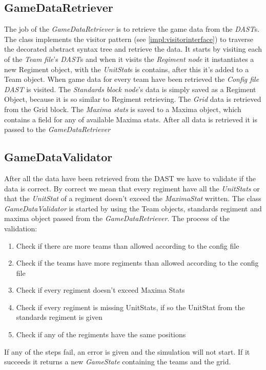 \subsection{GameDataRetriever}
	The job of the {\it GameDataRetriever} is to retrieve the game data from the {\it DAST}s. The class implements the visitor pattern
	(see \ref{impl:visitorinterface}) to traverse the decorated abstract syntax tree and retrieve the data. 
	It starts by visiting each of the {\it Team file}'s {\it DAST}s and when it visits the {\it Regiment node} it instantiates a new Regiment object, 
	with the {\it UnitStat}s is contains, after this it's added to a Team object. When game data for every team have been retrieved the {\it Config file}
	{\it DAST} is visited. The {\it Standards block node}'s data is simply saved as a Regiment Object, because it is so similar to Regiment retrieving. 
	The {\it Grid} data is retrieved from the Grid block. The {\it Maxima stats} is saved to a Maxima object, which contains a field for any of available 
	Maxima stats. After all data is retrieved it is passed to the {\it GameDataRetriever}

\subsection{GameDataValidator}
	After all the data have been retrieved from the DAST we have to validate if the data is correct. 
	By correct we mean that every regiment have all the {\it UnitStats} or that the {\it UnitStat} 
	of a regiment doesn't exceed the {\it MaximaStat} written. 
	The class {\it GameDataValidator} is started by using the Team objects, standards regiment and maxima object passed from the {\it GameDataRetriever}.
	The process of the validation: \\
	\begin{enumerate}
		\item Check if there are more teams than allowed according to the config file
		\item Check if the teams have more regiments than allowed according to the config file
		\item Check if every regiment doesn't exceed Maxima Stats
		\item Check if every regiment is missing UnitStats, if so the UnitStat from the standards regiment is given
		\item Check if any of the regiments have the same positions
	\end{enumerate}
	If any of the steps fail, an error is given and the simulation will not start. If it succeeds it returns a new {\it GameState} containing the teams 
	and the grid.
	
